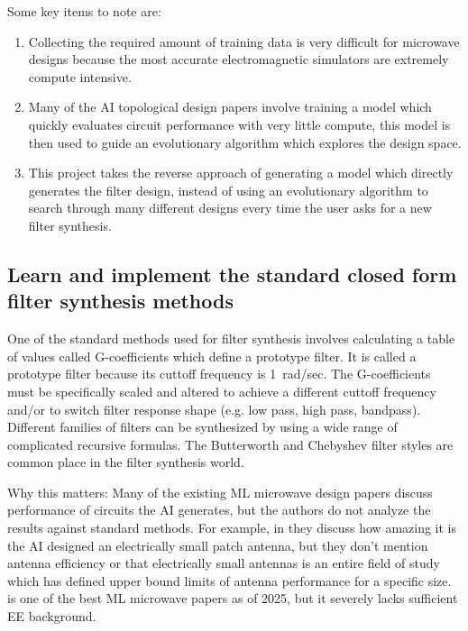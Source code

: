 \documentclass[10pt,conference]{IEEEtran}
\begin{document}
Some key items to note are:
\begin{enumerate}[label=\arabic*)]
    \item Collecting the required amount of training data is very difficult for microwave designs because the most accurate electromagnetic simulators are extremely compute intensive.
    \item Many of the AI topological design papers involve training a model which quickly evaluates circuit performance with very little compute, this model is then used to guide an evolutionary algorithm which explores the design space.
    \item This project takes the reverse approach of generating a model which directly generates the filter design, instead of using an evolutionary algorithm to search through many different designs every time the user asks for a new filter synthesis.
\end{enumerate}


\subsection{Learn and implement the standard closed form filter synthesis methods}

One of the standard methods used for filter synthesis involves calculating a table of values called G-coefficients which define a prototype filter. It is called a prototype filter because its cuttoff frequency is 1~rad/sec. The G-coefficients must be specifically scaled and altered to achieve a different cuttoff frequency and/or to switch filter response shape (e.g. low pass, high pass, bandpass). Different families of filters can be synthesized by using a wide range of complicated recursive formulas. The Butterworth and Chebyshev filter styles are common place in the filter synthesis world.

Why this matters: Many of the existing ML microwave design papers discuss performance of circuits the AI generates, but the authors do not analyze the results against standard methods. For example, in \cite{karahan2024rfdesign} they discuss how amazing it is the AI designed an electrically small patch antenna, but they don't mention antenna efficiency or that electrically small antennas is an entire field of study which has defined upper bound limits of antenna performance for a specific size. \cite{karahan2024rfdesign} is one of the best ML microwave papers as of 2025, but it severely lacks sufficient EE background.
\end{document}
